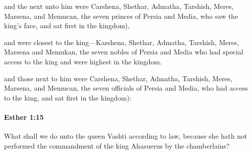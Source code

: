 			\begin{versebox}
					\item[BHS] 
					\item[LXX] 
					\item[ASV] and the next unto him were Carshena, Shethar, Admatha, Tarshish, Meres, Marsena, and Memucan, the seven princes of Persia and Media, who saw the king's face, and sat first in the kingdom),
					\item[NIV] and were closest to the king—Karshena, Shethar, Admatha, Tarshish, Meres, Marsena and Memukan, the seven nobles of Persia and Media who had special access to the king and were highest in the kingdom.
					\item[NRSV] and those next to him were Carshena, Shethar, Admatha, Tarshish, Meres, Marsena, and Memucan, the seven officials of Persia and Media, who had access to the king, and sat first in the kingdom):
			\end{versebox}

		\paragraph{Esther 1:15} %
			\label{ESTHER-1-15}

			What shall we do unto the queen Vashti according to law, because she hath not performed the commandment of the king Ahasuerus by the chamberlains?

